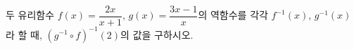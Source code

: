 두 유리함수 $f(x)=\dfrac{2x}{x+1}$, $g(x)=\dfrac{3x-1}{x}$의 역함수를 각각 $f^{-1}(x)$, $g^{-1}(x)$라 할 때, $(g^{-1}\circ f)^{-1}(2)$의 값을 구하시오.
